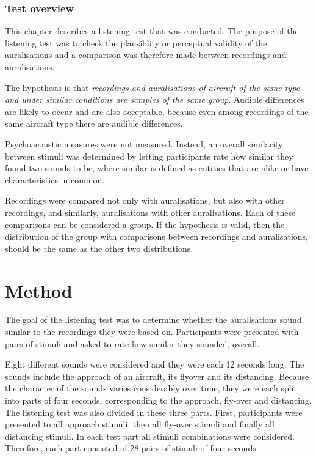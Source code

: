 \subsubsection*{Test overview}
This chapter describes a listening test that was conducted. The purpose of the
listening test was to check the plausiblity or perceptual validity of the
auralisations and a comparison was therefore made between recordings and
auralisations.

The hypothesis is that \emph{recordings and auralisations of aircraft of the same
type and under similar conditions are samples of the same group}.
Audible differences are likely to occur and are also acceptable, because even
among recordings of the same aircraft type there are audible differences.

Psychoacoustic measures were not measured. Instead, an overall similarity
between stimuli was determined by letting participants rate how similar they
found two sounds to be, where similar is defined as entities that are alike or
have characteristics in common.

Recordings were compared not only with auralisations,
but also with other recordings, and similarly, auralisations with other
auralisations. Each of these comparisons can be considered a group. If the
hypothesis is valid, then the distribution of the group with comparisons between
recordings and auralisations, should be the same as the other two distributions.

\section{Method}

The goal of the listening test was to determine whether the auralisations sound
similar to the recordings they were based on. Participants were presented with
pairs of stimuli and asked to rate how similar they sounded, overall.

Eight different sounds were considered and they were each 12 seconds long. The
sounds include the approach of an aircraft, its flyover and its distancing.
Because the character of the sounds varies considerably over time, they were
each split into parts of four seconds, corresponding to the approach, fly-over
and distancing. The listening test was also divided in these three parts. First,
participants were presented to all approach stimuli, then all fly-over stimuli
and finally all distancing stimuli. In each test part all stimuli combinations
were considered. Therefore, each part consisted of 28 pairs of stimuli of four
seconds.

